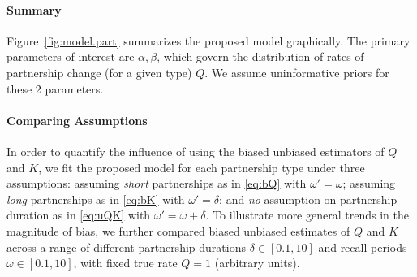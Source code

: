 \paragraph{Summary}
Figure~\ref{fig:model.part} summarizes the proposed model graphically.
The primary parameters of interest are $\alpha, \beta$, which govern
the distribution of rates of partnership change (for a given type) $Q$.
We assume uninformative priors for these 2 parameters.
\paragraph{Comparing Assumptions}
In order to quantify the influence of using
the biased \vs unbiased estimators of $Q$ and $K$,
we fit the proposed model for each partnership type under three assumptions:
assuming \emph{short} partnerships as in \eqref{eq:bQ} with $\omega' = \omega$;
assuming \emph{long} partnerships as in \eqref{eq:bK} with $\omega' = \delta$; and
\emph{no} assumption on partnership duration as in \eqref{eq:uQK} with $\omega' = \omega + \delta$.
To illustrate more general trends in the magnitude of bias,
we further compared biased \vs unbiased estimates of $Q$ and $K$ across a range of different
partnership durations $\delta \in [0.1, 10]$ and
recall periods $\omega \in [0.1, 10]$,
with fixed true rate $Q = 1$ (arbitrary units).

